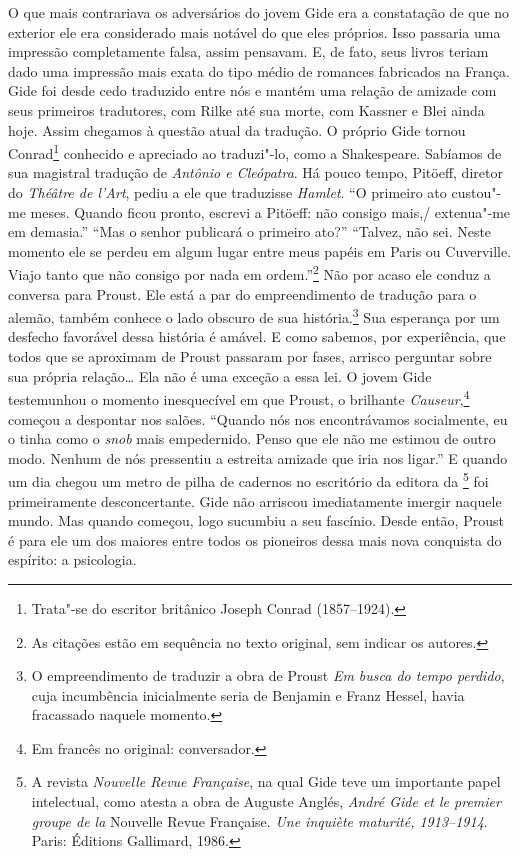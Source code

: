 O que mais contrariava os adversários do jovem Gide era a constatação de
que no exterior ele era considerado mais notável do que eles próprios.
Isso passaria uma impressão completamente falsa, assim pensavam.
E, de fato, seus livros teriam dado uma impressão mais exata do tipo médio de romances fabricados na França. Gide foi
desde cedo traduzido entre nós e mantém uma relação de amizade com seus
primeiros tradutores, com Rilke até sua morte, com Kassner e Blei ainda
hoje. Assim chegamos à questão atual da tradução. O próprio Gide
tornou Conrad\footnote{Trata"-se do escritor britânico Joseph
  Conrad (1857--1924). \versal{[N.~O.]}} conhecido e apreciado ao traduzi"-lo, como a Shakespeare. Sabíamos de sua magistral tradução de
\emph{Antônio e Cleópatra}. Há pouco tempo, Pitöeff, diretor do
\emph{Théâtre de l'Art}, pediu a ele que traduzisse \emph{Hamlet}.
``O primeiro ato custou"-me meses. Quando ficou pronto, escrevi a
Pitöeff: não consigo mais,/ extenua"-me em demasia.'' ``Mas o senhor
publicará o primeiro ato?'' ``Talvez, não sei. Neste momento ele se
perdeu em algum lugar entre meus papéis em Paris ou Cuverville. Viajo
tanto que não consigo por nada em ordem.''\footnote{As citações
  estão em sequência no texto original, sem indicar os autores. \versal{[N.~T.]}} Não por acaso ele conduz a conversa para Proust. Ele está a
par do empreendimento de tradução para o alemão, também conhece o lado
obscuro de sua história.\footnote{O empreendimento de traduzir a
  obra de Proust \emph{Em busca do tempo perdido}, cuja incumbência
  inicialmente seria de Benjamin e Franz Hessel, havia fracassado
  naquele momento. \versal{[N.~T.]}} Sua esperança por um desfecho
favorável dessa história é amável. E como sabemos, por experiência, que todos
que se aproximam de Proust passaram por fases, arrisco
perguntar sobre sua própria relação\ldots{} Ela não é uma exceção a essa lei.
O jovem Gide testemunhou o momento inesquecível em que Proust, o
brilhante \emph{Causeur},\footnote{Em francês no original: conversador. \versal{[N.~T.]}} começou
a despontar nos salões. ``Quando nós nos encontrávamos socialmente, eu o
tinha como o \emph{snob} mais empedernido. Penso que ele não me
estimou de outro modo. Nenhum de nós pressentiu a estreita amizade que
iria nos ligar.'' E quando um dia chegou um metro de pilha de cadernos
no escritório da editora da \footnote{A revista
  \emph{Nouvelle Revue Française}, na qual Gide teve um importante papel
  intelectual, como atesta a obra de Auguste Anglés, \emph{André Gide et
  le premier groupe de la} Nouvelle Revue Française. \emph{Une inquiète
  maturité, 1913--1914}. Paris: Éditions Gallimard, 1986. \versal{[N.~T.]}} foi
primeiramente desconcertante. Gide não arriscou imediatamente imergir
naquele mundo. Mas quando começou, logo sucumbiu a seu fascínio. Desde
então, Proust é para ele um dos maiores entre todos os pioneiros dessa
mais nova conquista do espírito: a psicologia.

